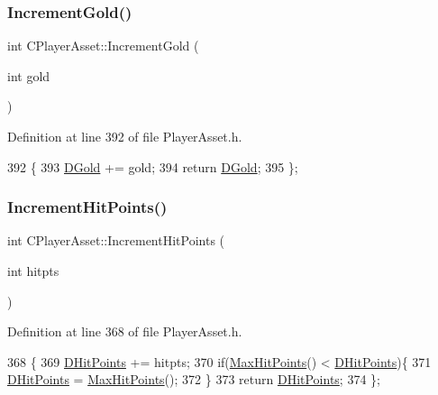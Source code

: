 \subsubsection{\texorpdfstring{Increment\+Gold()}{IncrementGold()}}
{\footnotesize\ttfamily int C\+Player\+Asset\+::\+Increment\+Gold (\begin{DoxyParamCaption}\item[{int}]{gold }\end{DoxyParamCaption})\hspace{0.3cm}{\ttfamily [inline]}}



Definition at line 392 of file Player\+Asset.\+h.


\begin{DoxyCode}
392                                    \{
393             \hyperlink{classCPlayerAsset_ab90ebdc73c6794fd44ddbe273f610292}{DGold} += gold;
394             \textcolor{keywordflow}{return} \hyperlink{classCPlayerAsset_ab90ebdc73c6794fd44ddbe273f610292}{DGold};
395         \};
\end{DoxyCode}
\hypertarget{classCPlayerAsset_a101767304149c0d1c1b0b88cf8e09b36}{}\label{classCPlayerAsset_a101767304149c0d1c1b0b88cf8e09b36} 
\subsubsection{\texorpdfstring{Increment\+Hit\+Points()}{IncrementHitPoints()}}
{\footnotesize\ttfamily int C\+Player\+Asset\+::\+Increment\+Hit\+Points (\begin{DoxyParamCaption}\item[{int}]{hitpts }\end{DoxyParamCaption})\hspace{0.3cm}{\ttfamily [inline]}}



Definition at line 368 of file Player\+Asset.\+h.


\begin{DoxyCode}
368                                           \{
369             \hyperlink{classCPlayerAsset_a331750935bf594e665544085fb74e89d}{DHitPoints} += hitpts;
370             \textcolor{keywordflow}{if}(\hyperlink{classCPlayerAsset_a119a30dbc2a8e4369b9525aca812618c}{MaxHitPoints}() < \hyperlink{classCPlayerAsset_a331750935bf594e665544085fb74e89d}{DHitPoints})\{
371                 \hyperlink{classCPlayerAsset_a331750935bf594e665544085fb74e89d}{DHitPoints} = \hyperlink{classCPlayerAsset_a119a30dbc2a8e4369b9525aca812618c}{MaxHitPoints}();   
372             \}
373             \textcolor{keywordflow}{return} \hyperlink{classCPlayerAsset_a331750935bf594e665544085fb74e89d}{DHitPoints};
374         \};
\end{DoxyCode}
\hypertarget{classCPlayerAsset_a12855b5c0cddb6b72e5ecba92ae77223}{}\label{classCPlayerAsset_a12855b5c0cddb6b72e5ecba92ae77223} 
